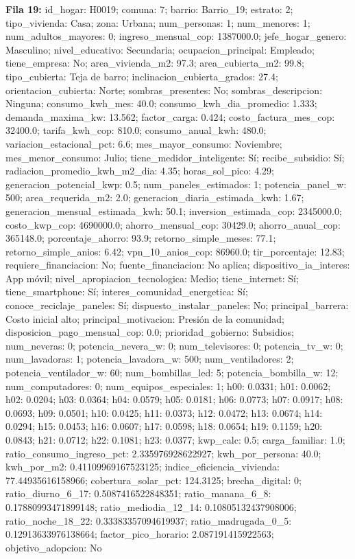 {\footnotesize\textbf{Fila 19:} id\_hogar: H0019; comuna: 7; barrio: Barrio\_19; estrato: 2; tipo\_vivienda: Casa; zona: Urbana; num\_personas: 1; num\_menores: 1; num\_adultos\_mayores: 0; ingreso\_mensual\_cop: 1387000.0; jefe\_hogar\_genero: Masculino; nivel\_educativo: Secundaria; ocupacion\_principal: Empleado; tiene\_empresa: No; area\_vivienda\_m2: 97.3; area\_cubierta\_m2: 99.8; tipo\_cubierta: Teja de barro; inclinacion\_cubierta\_grados: 27.4; orientacion\_cubierta: Norte; sombras\_presentes: No; sombras\_descripcion: Ninguna; consumo\_kwh\_mes: 40.0; consumo\_kwh\_dia\_promedio: 1.333; demanda\_maxima\_kw: 13.562; factor\_carga: 0.424; costo\_factura\_mes\_cop: 32400.0; tarifa\_kwh\_cop: 810.0; consumo\_anual\_kwh: 480.0; variacion\_estacional\_pct: 6.6; mes\_mayor\_consumo: Noviembre; mes\_menor\_consumo: Julio; tiene\_medidor\_inteligente: Sí; recibe\_subsidio: Sí; radiacion\_promedio\_kwh\_m2\_dia: 4.35; horas\_sol\_pico: 4.29; generacion\_potencial\_kwp: 0.5; num\_paneles\_estimados: 1; potencia\_panel\_w: 500; area\_requerida\_m2: 2.0; generacion\_diaria\_estimada\_kwh: 1.67; generacion\_mensual\_estimada\_kwh: 50.1; inversion\_estimada\_cop: 2345000.0; costo\_kwp\_cop: 4690000.0; ahorro\_mensual\_cop: 30429.0; ahorro\_anual\_cop: 365148.0; porcentaje\_ahorro: 93.9; retorno\_simple\_meses: 77.1; retorno\_simple\_anios: 6.42; vpn\_10\_anios\_cop: 86960.0; tir\_porcentaje: 12.83; requiere\_financiacion: No; fuente\_financiacion: No aplica; dispositivo\_ia\_interes: App móvil; nivel\_apropiacion\_tecnologica: Medio; tiene\_internet: Sí; tiene\_smartphone: Sí; interes\_comunidad\_energetica: Sí; conoce\_reciclaje\_paneles: Sí; dispuesto\_instalar\_paneles: No; principal\_barrera: Costo inicial alto; principal\_motivacion: Presión de la comunidad; disposicion\_pago\_mensual\_cop: 0.0; prioridad\_gobierno: Subsidios; num\_neveras: 0; potencia\_nevera\_w: 0; num\_televisores: 0; potencia\_tv\_w: 0; num\_lavadoras: 1; potencia\_lavadora\_w: 500; num\_ventiladores: 2; potencia\_ventilador\_w: 60; num\_bombillas\_led: 5; potencia\_bombilla\_w: 12; num\_computadores: 0; num\_equipos\_especiales: 1; h00: 0.0331; h01: 0.0062; h02: 0.0204; h03: 0.0364; h04: 0.0579; h05: 0.0181; h06: 0.0773; h07: 0.0917; h08: 0.0693; h09: 0.0501; h10: 0.0425; h11: 0.0373; h12: 0.0472; h13: 0.0674; h14: 0.0294; h15: 0.0453; h16: 0.0607; h17: 0.0598; h18: 0.0654; h19: 0.1159; h20: 0.0843; h21: 0.0712; h22: 0.1081; h23: 0.0377; kwp\_calc: 0.5; carga\_familiar: 1.0; ratio\_consumo\_ingreso\_pct: 2.335976928622927; kwh\_por\_persona: 40.0; kwh\_por\_m2: 0.41109969167523125; indice\_eficiencia\_vivienda: 77.44935616158966; cobertura\_solar\_pct: 124.3125; brecha\_digital: 0; ratio\_diurno\_6\_17: 0.5087416522848351; ratio\_manana\_6\_8: 0.17880993471899148; ratio\_mediodia\_12\_14: 0.10805132437908006; ratio\_noche\_18\_22: 0.33383357094619937; ratio\_madrugada\_0\_5: 0.12913633976138664; factor\_pico\_horario: 2.087191415922563; objetivo\_adopcion: No\par}
